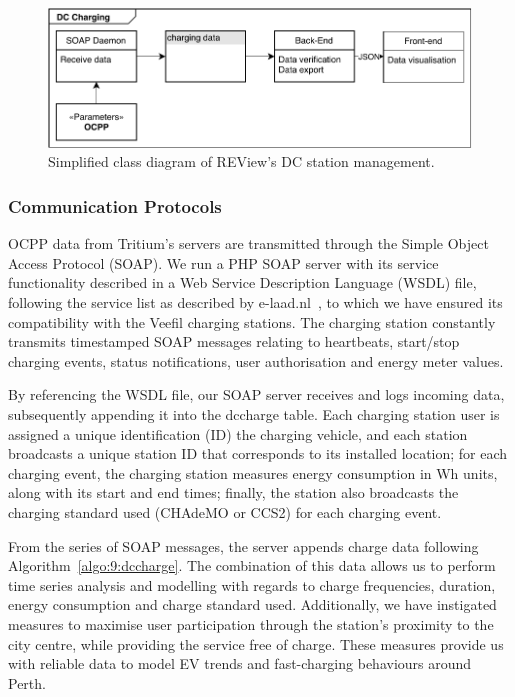 \begin{figure}[H]
	\centering
	\includegraphics[width=\linewidth]{uml-dc}
	\caption{Simplified class diagram of REView’s DC station management.}
	\label{fig:9:umldc}
\end{figure}

\subsubsection{Communication Protocols}
OCPP data from Tritium’s servers are transmitted through the Simple Object Access Protocol (SOAP). We run a PHP SOAP server with its service functionality described in a Web Service Description Language (WSDL) file, following the service list as described by e-laad.nl~\cite{elaadnl_elaad_nodate}, to which we have ensured its compatibility with the Veefil charging stations. The charging station constantly transmits timestamped SOAP messages relating to heartbeats, start/stop charging events, status notifications, user authorisation and energy meter values.


By referencing the WSDL file, our SOAP server receives and logs incoming data, subsequently appending it into the dccharge table. Each charging station user is assigned a unique identification (ID) the charging vehicle, and each station broadcasts a unique station ID that corresponds to its installed location; for each charging event, the charging station measures energy consumption in Wh units, along with its start and end times; finally, the station also broadcasts the charging standard used (CHAdeMO or CCS2) for each charging event.


From the series of SOAP messages, the server appends charge data following Algorithm~\ref{algo:9:dccharge}.
The combination of this data allows us to perform time series analysis and modelling with regards to charge frequencies, duration, energy consumption and charge standard used. Additionally, we have instigated measures to maximise user participation through the station’s proximity to the city centre, while providing the service free of charge. These measures provide us with reliable data to model EV trends and fast-charging behaviours around Perth.

